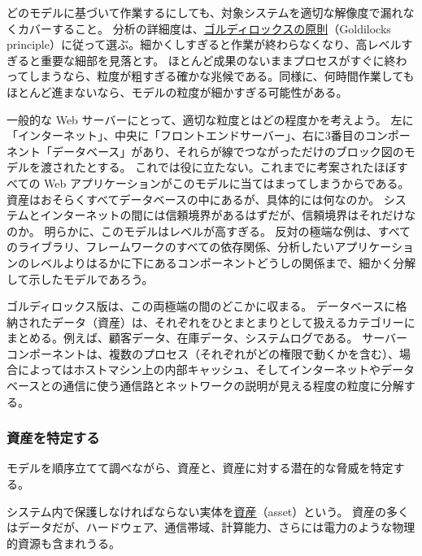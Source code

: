 \documentclass[uplatex]{jsarticle}
\def\label#1{}%
\begin{document}
どのモデルに基づいて作業するにしても、対象システムを適切な解像度で漏れなくカバーすること。
分析の詳細度は、\underline{ゴルディロックスの原則}（Goldilocks principle）に従って選ぶ。細かくしすぎると作業が終わらなくなり、高レベルすぎると重要な細部を見落とす。
ほとんど成果のないままプロセスがすぐに終わってしまうなら、粒度が粗すぎる確かな兆候である。同様に、何時間作業してもほとんど進まないなら、モデルの粒度が細かすぎる可能性がある。

\begin{exa}\label{exa:ch2-web-server-granularity}
一般的な Web サーバーにとって、適切な粒度とはどの程度かを考えよう。
左に「インターネット」、中央に「フロントエンドサーバー」、右に3番目のコンポーネント「データベース」があり、それらが線でつながっただけのブロック図のモデルを渡されたとする。
これでは役に立たない。これまでに考案されたほぼすべての Web アプリケーションがこのモデルに当てはまってしまうからである。
資産はおそらくすべてデータベースの中にあるが、具体的には何なのか。
システムとインターネットの間には信頼境界があるはずだが、信頼境界はそれだけなのか。
明らかに、このモデルはレベルが高すぎる。
反対の極端な例は、すべてのライブラリ、フレームワークのすべての依存関係、分析したいアプリケーションのレベルよりはるかに下にあるコンポーネントどうしの関係まで、細かく分解して示したモデルであろう。

ゴルディロックス版は、この両極端の間のどこかに収まる。
データベースに格納されたデータ（資産）は、それぞれをひとまとまりとして扱えるカテゴリーにまとめる。例えば、顧客データ、在庫データ、システムログである。
サーバーコンポーネントは、複数のプロセス（それぞれがどの権限で動くかを含む）、場合によってはホストマシン上の内部キャッシュ、そしてインターネットやデータベースとの通信に使う通信路とネットワークの説明が見える程度の粒度に分解する。
\end{exa}

\subsubsection{資産を特定する}\label{subsec:ch2-identify-assets}

モデルを順序立てて調べながら、資産と、資産に対する潜在的な脅威を特定する。

\begin{dfn}[資産]\label{dfn:ch2-asset}
システム内で保護しなければならない実体を\underline{資産}（asset）という。
資産の多くはデータだが、ハードウェア、通信帯域、計算能力、さらには電力のような物理的資源も含まれうる。
\end{dfn}
\end{document}
